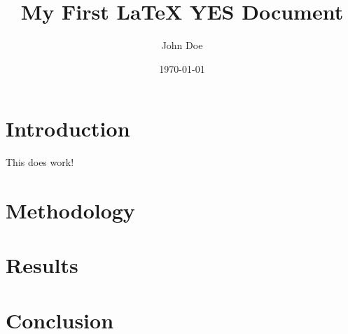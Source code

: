 \documentclass{article}
\title{My First LaTeX YES Document}
\author{John Doe}
\date{\today}
\begin{document}
\maketitle

\section{Introduction}
This does work! \n

\lipsum[1]

\section{Methodology}

\lipsum[2]

\section{Results}

\lipsum[3]

\section{Conclusion}

\lipsum[4]
\end{document}
